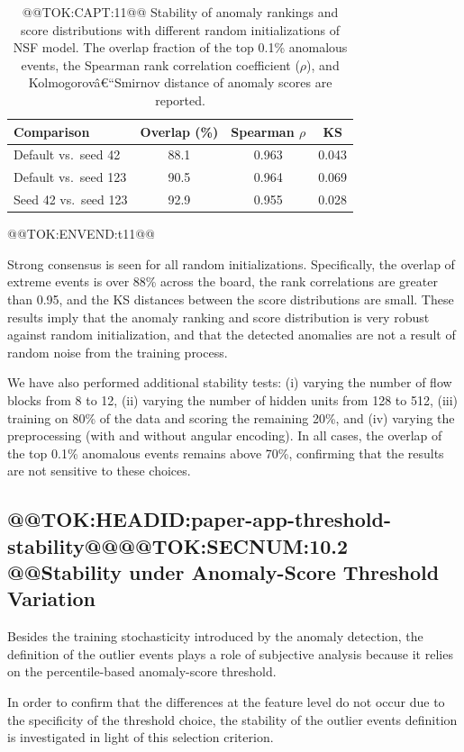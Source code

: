 \documentclass[11pt]{article}
\begin{document}
\begin{table}[h]
\centering
\small
\setlength{\tabcolsep}{4pt}
\caption{@@TOK:CAPT:11@@ Stability of anomaly rankings and score distributions with different random initializations of NSF model. The overlap fraction of the top 0.1\% anomalous events, the Spearman rank correlation coefficient ($\rho$), and Kolmogorovâ€“Smirnov distance of anomaly scores are reported.}
\label{tab:seed_stability}
\begin{tabular}{lccc}
\hline
Comparison & Overlap (\%) & Spearman $\rho$ & KS \\
\hline
Default vs.\ seed 42  & 88.1 & 0.963 & 0.043 \\
Default vs.\ seed 123 & 90.5 & 0.964 & 0.069 \\
Seed 42 vs.\ seed 123 & 92.9 & 0.955 & 0.028 \\
\hline
\end{tabular}
@@TOK:ENVEND:t11@@\end{table}

Strong consensus is seen for all random initializations. Specifically, the overlap of extreme events is over 88\% across the board, the rank correlations are greater than 0.95, and the KS distances between the score distributions are small. These results imply that the anomaly ranking and score distribution is very robust against random initialization, and that the detected anomalies are not a result of random noise from the training process.

We have also performed additional stability tests: (i) varying the number of flow blocks from 8 to 12, (ii) varying the number of hidden units from 128 to 512, (iii) training on 80\% of the data and scoring the remaining 20\%, and (iv) varying the preprocessing (with and without angular encoding). In all cases, the overlap of the top 0.1\% anomalous events remains above 70\%, confirming that the results are not sensitive to these choices.

\subsection{@@TOK:HEADID:paper-app-threshold-stability@@@@TOK:SECNUM:10.2 @@Stability under Anomaly-Score Threshold Variation}

Besides the training stochasticity introduced by the anomaly detection, the definition of the outlier events plays a role of subjective analysis because it relies on the percentile-based anomaly-score threshold.

In order to confirm that the differences at the feature level do not occur due to the specificity of the threshold choice, the stability of the outlier events definition is investigated in light of this selection criterion.
\end{document}
